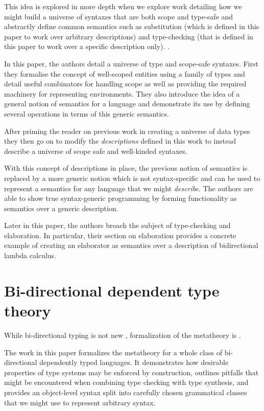 This idea is explored in more depth when we
explore work detailing how we might build a universe of
syntaxes that are both scope and type-safe and abstractly
define common semantics such as substitution (which is defined in this
paper to work over arbitrary descriptions) and type-checking (that is
defined in this paper to work over a specific description only).
\cite{DBLP:journals/corr/abs-2001-11001}.

In this paper, the authors detail a universe of type and scope-safe
syntaxes. First they formalise the concept of well-scoped entities
using a family of types and detail useful combinators for handling
scope as well as providing the required machinery for representing
environments. They also introduce the idea of a general notion of
semantics for a language and demonstrate its use by defining several
operations in terms of this generic semantics.

After priming the reader on previous work in creating a universe of
data types \cite{DBLP:conf/icfp/ChapmanDMM10} they then go on to
modify the \emph{descriptions} defined in this work to instead
describe a universe of scope safe and well-kinded syntaxes.

With this concept of descriptions in place, the previous notion of
semantics is replaced by a more generic notion which is not
syntax-specific and can be used to represent a semantics for any
language that we might \emph{describe}. The authors are able to show
true syntax-generic programming by forming functionality as semantics
over a generic description.

Later in this paper, the authors broach the subject of type-checking
and elaboration. In particular, their section on elaboration provides
a concrete example of creating an elaborator as semantics over a
description of bidirectional lambda calculus.

\section{Bi-directional dependent type theory}

While bi-directional typing is not new
\cite{DBLP:journals/toplas/PierceT00}, formalization of the metatheory
is \cite{TypesWhoSayNi}. 

The work in this paper formalizes the metatheory for a whole class of
bi-directional dependently typed languages. It demonstrates how
desirable properties of type systems may be enforced by construction,
outlines pitfalls that might be encountered when combining type
checking with type synthesis, and provides an object-level
syntax split into carefully chosen grammatical classes that we might
use to represent arbitrary syntax.

